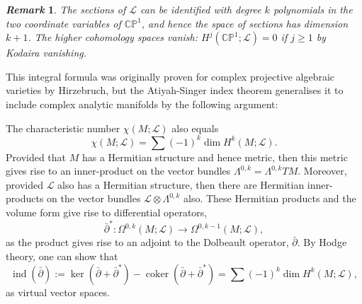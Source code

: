 \documentclass{article}
\newtheorem{remark}{\it Remark\/}
\newcommand{\lra}{\longrightarrow}
\newcommand{\W}{\Omega}
\newcommand{\PP}{\mathbb{P}}
\newcommand{\CC}{\mathbb{C}}
\newcommand{\mcL}{\mathcal{L}}
\DeclareMathOperator{\ind}{ind}
\DeclareMathOperator{\coker}{coker}
\begin{document}
\begin{remark}
	The sections of $\mcL$ can be identified with degree $k$ polynomials in the two coordinate variables of $\CC\PP^{1}$, and hence the space of sections has dimension $k+1$. The higher cohomology spaces vanish: $H^{j}(\CC\PP^{1}; \mcL) = 0$ if $j \geq 1$ by Kodaira vanishing.
\end{remark}

This integral formula was originally proven for complex projective algebraic varieties by Hirzebruch, but the Atiyah-Singer index theorem generalises it to include complex analytic manifolds by the following argument:

The characteristic number $\chi(M; \mcL)$ also equals
\begin{equation*}
	\chi(M; \mcL) = \sum (-1)^{k} \dim H^{k}(M; \mcL).
\end{equation*}
Provided that $M$ has a Hermitian structure and hence metric, then this metric gives rise to an inner-product on the vector bundles $\Lambda^{0,k} = \Lambda^{0,k}TM$. Moreover, provided $\mcL$ also has a Hermitian structure, then there are Hermitian inner-products on the vector bundles $\mcL \otimes \Lambda^{0,k}$ also. These Hermitian products and the volume form give rise to differential operators,
	\begin{equation*}
		\bar{\partial}^{\ast} : \W^{0,k}(M; \mcL) \lra \W^{0,k-1}(M; \mcL),
	\end{equation*}
as the product gives rise to an adjoint to the Dolbeault operator, $\bar{\partial}$. By Hodge theory, one can show that
	\begin{equation*}
		\ind(\bar{\partial}) := \ker( \bar{\partial} + \bar{\partial}^{\ast} ) - \coker( \bar{\partial} + \bar{\partial}^{\ast} ) =  \sum (-1)^{k} \dim H^{k}(M; \mcL),
	\end{equation*}
as virtual vector spaces.





  


\end{document}
